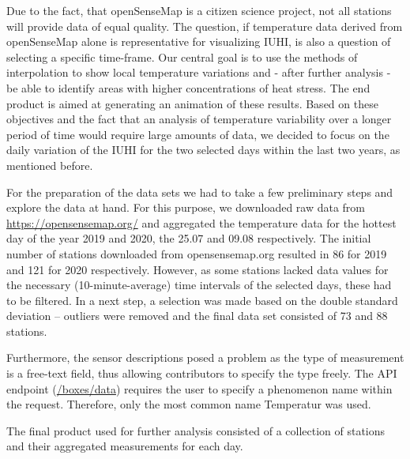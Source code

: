 Due to the fact, that openSenseMap is a citizen science project, not all stations will provide data of equal quality. The question, if temperature data derived from openSenseMap alone is representative for visualizing IUHI, is also a question of selecting a specific time-frame. Our central goal is to use the methods of interpolation to show local temperature variations and - after further analysis - be able to identify areas with higher concentrations of heat stress. The end product is aimed at generating an animation of these results. Based on these objectives and the fact that an analysis of temperature variability over a longer period of time would require large amounts of data, we decided to focus on the daily variation of the IUHI for the two selected days within the last two years, as mentioned before.

For the preparation of the data sets we had to take a few preliminary steps and explore the data at hand. For this purpose, we downloaded raw data from \url{https://opensensemap.org/} and aggregated the temperature data for the hottest day of the year 2019 and 2020, the 25.07 and 09.08 respectively. The initial number of stations downloaded from opensensemap.org resulted in 86 for 2019 and 121 for 2020 respectively. However, as some stations lacked data values for the necessary (10-minute-average) time intervals of the selected days, these had to be filtered. In a next step, a selection was made based on the double standard deviation – outliers were removed and the final data set consisted of 73 and 88 stations.

Furthermore, the sensor descriptions posed a problem as the type of measurement is a free-text field, thus allowing contributors to specify the type freely. The API endpoint (\url{/boxes/data}) requires the user to specify a phenomenon name within the request. Therefore, only the most common name \ldq{}Temperatur\rdq{} was used.

The final product used for further analysis consisted of a collection of stations and their aggregated measurements for each day.


